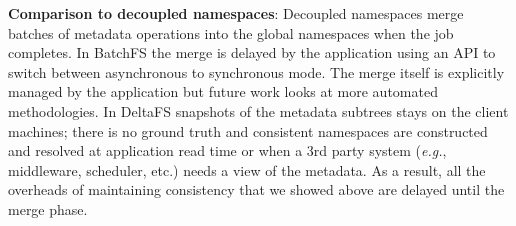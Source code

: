 
\textbf{Comparison to decoupled namespaces}: Decoupled namespaces
merge batches of metadata operations into the global namespaces when the job
completes.  In BatchFS the merge is delayed by the application using an API to
switch between asynchronous to synchronous mode. The merge itself is explicitly
managed by the application but future work looks at more automated
methodologies. In DeltaFS snapshots of the metadata subtrees stays on the client
machines; there is no ground truth and consistent namespaces are constructed
and resolved at application read time or when a 3rd party system ({\it e.g.},
middleware, scheduler, etc.) needs a view of the metadata. As a result, all the
overheads of maintaining consistency that we showed above are delayed until the
merge phase.
